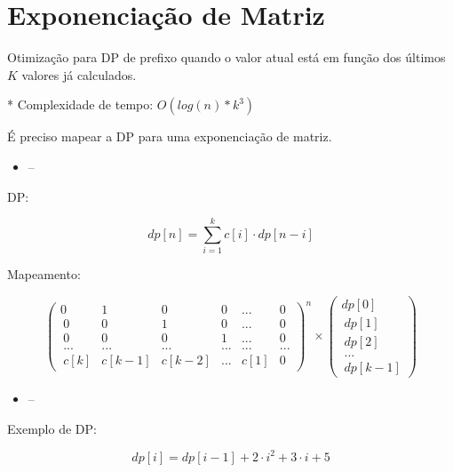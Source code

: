 \documentclass[11pt, a4paper, oneside]{book}
\begin{document}
\hfill

\section{Exponenciação de Matriz}


Otimização para DP de prefixo quando o valor atual está em função dos últimos $K$ valores já calculados.   



* Complexidade de tempo: $O(log(n)*k^3)$



É preciso mapear a DP para uma exponenciação de matriz.



\begin{itemize}
\item --
\end{itemize}





\textbf{} 


DP:   

$$ dp[n] = \sum_{i=1}^{k} c[i] \cdot dp[n - i]$$ 



Mapeamento:   



$$ \begin{pmatrix} 0&1&0&0&...&0 \\\ 0&0&1&0&...&0 \\\ 0&0&0&1&...&0 \\\ ...&...&...&...&...&... \\\ c[k]&c[k-1]&c[k-2]&...&c[1]&0 \end{pmatrix}^n \times \begin{pmatrix} dp[0] \\\ dp[1] \\\ dp[2] \\\ ... \\\ dp[k-1] \end{pmatrix} $$



\begin{itemize}
\item --
\end{itemize}

\textbf{} 


Exemplo de DP:   



$$ dp[i] = dp[i-1] + 2 \cdot i^2 + 3 \cdot i + 5 $$
\end{document}
